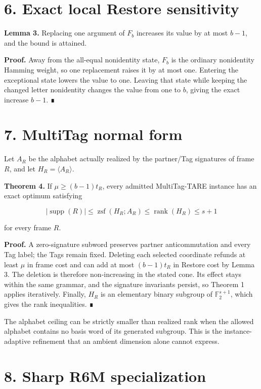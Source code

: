 \documentclass[
  11pt,
]{article}
\begin{document}
\hypertarget{exact-local-restore-sensitivity}{%
\section{6. Exact local Restore
sensitivity}\label{exact-local-restore-sensitivity}}

\textbf{Lemma 3.} Replacing one argument of \(F_b\) increases its value
by at most \(b-1\), and the bound is attained.

\textbf{Proof.} Away from the all-equal nonidentity state, \(F_b\) is
the ordinary nonidentity Hamming weight, so one replacement raises it by
at most one. Entering the exceptional state lowers the value to one.
Leaving that state while keeping the changed letter nonidentity changes
the value from one to \(b\), giving the exact increase \(b-1\). ∎

\hypertarget{multitag-normal-form}{%
\section{7. MultiTag normal form}\label{multitag-normal-form}}

Let \(A_R\) be the alphabet actually realized by the partner/Tag
signatures of frame \(R\), and let \(H_R=\langle A_R\rangle\).

\textbf{Theorem 4.} If \(\mu\ge(b-1)t_R\), every admitted MultiTag-TARE
instance has an exact optimum satisfying

\[
|\operatorname{supp}(R)|
\le \operatorname{zsf}(H_R; A_R)
\le \operatorname{rank}(H_R)
\le s+1
\]

for every frame \(R\).

\textbf{Proof.} A zero-signature subword preserves partner
anticommutation and every Tag label; the Tags remain fixed. Deleting
each selected coordinate refunds at least \(\mu\) in frame cost and can
add at most \((b-1)t_R\) in Restore cost by Lemma 3. The deletion is
therefore non-increasing in the stated cone. Its effect stays within the
same grammar, and the signature invariants persist, so Theorem 1 applies
iteratively. Finally, \(H_R\) is an elementary binary subgroup of
\(\mathbb F_2^{s+1}\), which gives the rank inequalities. ∎

The alphabet ceiling can be strictly smaller than realized rank when the
allowed alphabet contains no basis word of its generated subgroup. This
is the instance-adaptive refinement that an ambient dimension alone
cannot express.

\hypertarget{sharp-r6m-specialization}{%
\section{8. Sharp R6M specialization}\label{sharp-r6m-specialization}}
\end{document}
